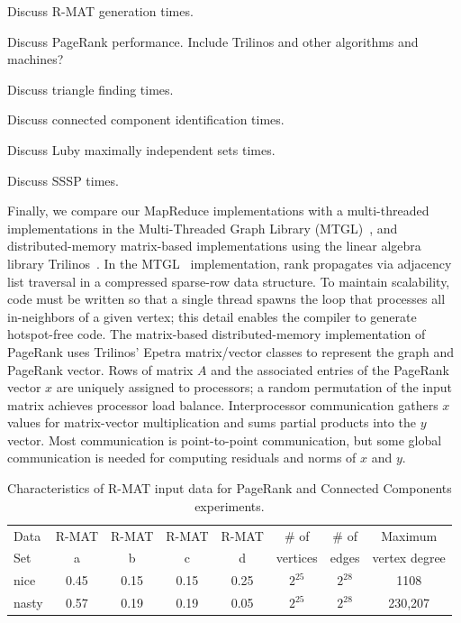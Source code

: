 Discuss R-MAT generation times.

Discuss PageRank performance.  Include Trilinos and other
algorithms and machines?

Discuss triangle finding times.

Discuss connected component identification times.

Discuss Luby maximally independent sets times.

Discuss SSSP times.

Finally, we compare our MapReduce implementations with a multi-threaded
implementations
in the Multi-Threaded Graph Library (MTGL)~\cite{MTGL}, and
distributed-memory matrix-based implementations using the linear
algebra library Trilinos~\cite{Trilinos-Overview}.
In the MTGL~\cite{MTGL} implementation,
rank propagates via adjacency list traversal
in a compressed sparse-row data structure.
To maintain scalability, code must
be written so that a single thread spawns the loop that processes all
in-neighbors of a given vertex; this detail enables the compiler to generate
hotspot-free code.
The matrix-based distributed-memory implementation of PageRank
uses Trilinos' Epetra matrix/vector classes to represent the graph and
PageRank vector.
Rows of matrix $A$ and the associated entries of the PageRank vector $x$
are uniquely assigned to processors; a random permutation of the input
matrix achieves processor load balance.
Interprocessor communication gathers $x$ values for matrix-vector
multiplication and sums partial products into the $y$ vector.
Most communication is point-to-point communication,
but some global communication is needed for computing
residuals and norms of $x$ and $y$.

\begin{table}
\begin{tabular}{|l|c|c|c|c|c|c|c|}
\hline
Data & R-MAT  & R-MAT  & R-MAT  & R-MAT  & \# of    & \# of & Maximum \\
Set  & a      & b      & c      & d      & vertices & edges & vertex degree\\
\hline
nice  & 0.45 & 0.15 & 0.15 & 0.25 & $2^{25}$ & $2^{28}$ & 1108 \\
nasty & 0.57 & 0.19 & 0.19 & 0.05 & $2^{25}$ & $2^{28}$ & 230,207\\
\hline
\end{tabular}
\caption{Characteristics of R-MAT input data for PageRank and Connected
Components experiments.}
\label{t:rmat}
\end{table}

